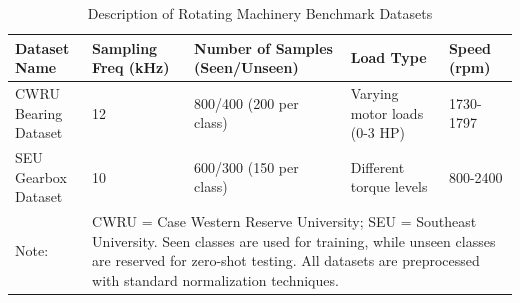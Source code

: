 \begin{table}[htbp]
\centering
\caption{Description of Rotating Machinery Benchmark Datasets}
\label{tab:datasets}
\begin{tabular}{p{3.5cm}p{2.5cm}p{3cm}p{2cm}p{2cm}}
\toprule
\textbf{Dataset Name} & \textbf{Sampling Freq (kHz)} & \textbf{Number of Samples (Seen/Unseen)} & \textbf{Load Type} & \textbf{Speed (rpm)} \\
\midrule
CWRU Bearing Dataset & 12 & 800/400 (200 per class) & Varying motor loads (0-3 HP) & 1730-1797 \\
\midrule
SEU Gearbox Dataset & 10 & 600/300 (150 per class) & Different torque levels & 800-2400 \\
\midrule
Note: & \multicolumn{4}{p{12cm}}{CWRU = Case Western Reserve University; SEU = Southeast University. Seen classes are used for training, while unseen classes are reserved for zero-shot testing. All datasets are preprocessed with standard normalization techniques.} \\
\bottomrule
\end{tabular}
\end{table}